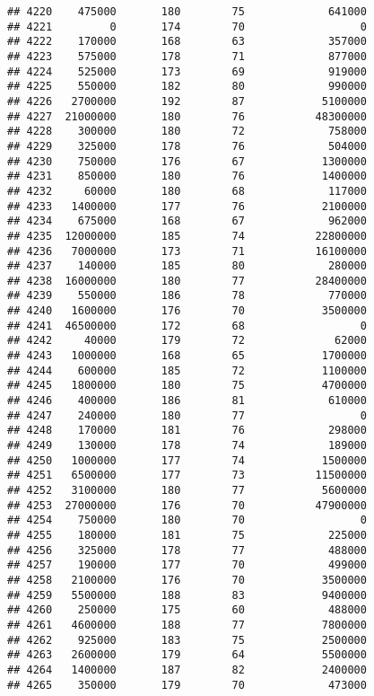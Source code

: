 \documentclass[
]{article}
\begin{document}
\begin{verbatim}
## 4220    475000       180        75             641000
## 4221         0       174        70                  0
## 4222    170000       168        63             357000
## 4223    575000       178        71             877000
## 4224    525000       173        69             919000
## 4225    550000       182        80             990000
## 4226   2700000       192        87            5100000
## 4227  21000000       180        76           48300000
## 4228    300000       180        72             758000
## 4229    325000       178        76             504000
## 4230    750000       176        67            1300000
## 4231    850000       180        76            1400000
## 4232     60000       180        68             117000
## 4233   1400000       177        76            2100000
## 4234    675000       168        67             962000
## 4235  12000000       185        74           22800000
## 4236   7000000       173        71           16100000
## 4237    140000       185        80             280000
## 4238  16000000       180        77           28400000
## 4239    550000       186        78             770000
## 4240   1600000       176        70            3500000
## 4241  46500000       172        68                  0
## 4242     40000       179        72              62000
## 4243   1000000       168        65            1700000
## 4244    600000       185        72            1100000
## 4245   1800000       180        75            4700000
## 4246    400000       186        81             610000
## 4247    240000       180        77                  0
## 4248    170000       181        76             298000
## 4249    130000       178        74             189000
## 4250   1000000       177        74            1500000
## 4251   6500000       177        73           11500000
## 4252   3100000       180        77            5600000
## 4253  27000000       176        70           47900000
## 4254    750000       180        70                  0
## 4255    180000       181        75             225000
## 4256    325000       178        77             488000
## 4257    190000       177        70             499000
## 4258   2100000       176        70            3500000
## 4259   5500000       188        83            9400000
## 4260    250000       175        60             488000
## 4261   4600000       188        77            7800000
## 4262    925000       183        75            2500000
## 4263   2600000       179        64            5500000
## 4264   1400000       187        82            2400000
## 4265    350000       179        70             473000

\end{verbatim}
\end{document}
